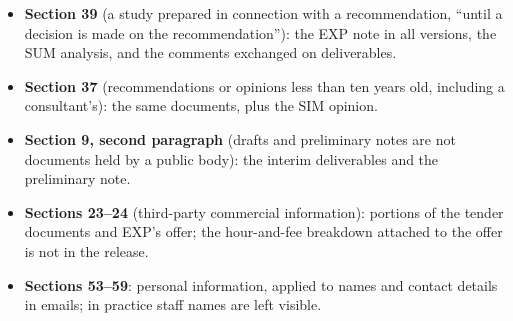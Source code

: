 \documentclass[11pt,letterpaper]{article}
\begin{document}
\begin{itemize}[nosep]
  \item \textbf{Section 39} (a study prepared in connection with a
    recommendation, ``until a decision is made on the recommendation''):
    the EXP note in all versions, the SUM analysis, and the comments
    exchanged on deliverables.
  \item \textbf{Section 37} (recommendations or opinions less than ten years
    old, including a consultant's): the same documents, plus the SIM
    opinion.
  \item \textbf{Section 9, second paragraph} (drafts and preliminary notes
    are not documents held by a public body): the interim deliverables and
    the preliminary note.
  \item \textbf{Sections 23--24} (third-party commercial information):
    portions of the tender documents and EXP's offer; the hour-and-fee
    breakdown attached to the offer is not in the release.
  \item \textbf{Sections 53--59}: personal information, applied to names
    and contact details in emails; in practice staff names are left
    visible.
\end{itemize}
\end{document}
